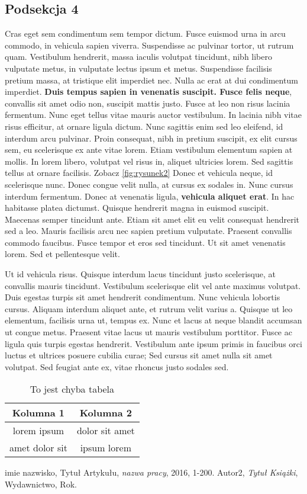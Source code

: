 \documentclass[12pt]{article}
\begin{document}
\subsection*{Podsekcja 4}
 Cras eget sem condimentum sem tempor dictum. Fusce euismod urna in arcu commodo, in vehicula sapien viverra. Suspendisse ac pulvinar tortor, ut rutrum quam. Vestibulum hendrerit, massa iaculis volutpat tincidunt, nibh libero vulputate metus, in vulputate lectus ipsum et metus. Suspendisse facilisis pretium massa, at tristique elit imperdiet nec. Nulla ac erat at dui condimentum imperdiet. \textbf{Duis tempus sapien in venenatis suscipit. Fusce felis neque}, convallis sit amet odio non, suscipit mattis justo. Fusce at leo non risus lacinia fermentum. Nunc eget tellus vitae mauris auctor vestibulum. In lacinia nibh vitae risus efficitur, at ornare ligula dictum. Nunc sagittis enim sed leo eleifend, id interdum arcu pulvinar. Proin consequat, nibh in pretium suscipit, ex elit cursus sem, eu scelerisque ex ante vitae lorem. Etiam vestibulum elementum sapien at mollis. In lorem libero, volutpat vel risus in, aliquet ultricies lorem. Sed sagittis tellus at ornare facilisis.
Zobacz \ref{fig:rysunek2}
Donec et vehicula neque, id scelerisque nunc. Donec congue velit nulla, at cursus ex sodales in. Nunc cursus interdum fermentum. Donec at venenatis ligula, \textbf{vehicula aliquet erat}. In hac habitasse platea dictumst. Quisque hendrerit magna in euismod suscipit. Maecenas semper tincidunt ante. Etiam sit amet elit eu velit consequat hendrerit sed a leo. Mauris facilisis arcu nec sapien pretium vulputate. Praesent convallis commodo faucibus. Fusce tempor et eros sed tincidunt. Ut sit amet venenatis lorem. Sed et pellentesque velit. 

Ut id vehicula risus. Quisque interdum lacus tincidunt justo scelerisque, at convallis mauris tincidunt. Vestibulum scelerisque elit vel ante maximus volutpat. Duis egestas turpis sit amet hendrerit condimentum. Nunc vehicula lobortis cursus. Aliquam interdum aliquet ante, et rutrum velit varius a. Quisque ut leo elementum, facilisis urna ut, tempus ex. Nunc et lacus at neque blandit accumsan ut congue metus. Praesent vitae lacus ut mauris vestibulum porttitor. Fusce ac ligula quis turpis egestas hendrerit. Vestibulum ante ipsum primis in faucibus orci luctus et ultrices posuere cubilia curae; Sed cursus sit amet nulla sit amet volutpat. Sed feugiat ante ex, vitae rhoncus justo sodales sed. 

\begin{table}[h]
    \centering
    \begin{tabular}{|c|c|}
        \hline
        Kolumna 1 & Kolumna 2 \\
        \hline
        lorem ipsum &  dolor sit amet\\
        amet dolor sit &  ipsum lorem\\
        \hline
    \end{tabular}
    \caption{To jest chyba tabela}
    \label{tab:tabela1}
\end{table}


\begin{thebibliography}{99}
 imie nazwisko, Tytuł Artykułu, \emph{nazwa pracy}, 2016, 1-200.
 Autor2, \emph{Tytuł Książki}, Wydawnictwo, Rok.
\end{thebibliography}
\end{document}
